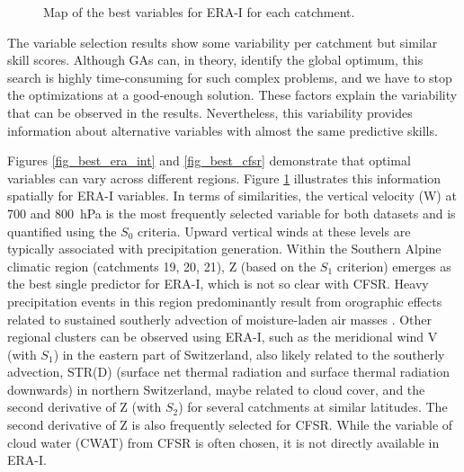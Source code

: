 \documentclass[draft]{agujournal2019}
\begin{document}
\begin{figure}[hbt]
	\noindent{}
	\caption{Map of the best variables for ERA-I for each catchment.}
	\label{fig_map_variables}
\end{figure}

The variable selection results show some variability per catchment but similar skill scores. Although GAs can, in theory, identify the global optimum, this search is highly time-consuming for such complex problems, and we have to stop the optimizations at a good-enough solution. These factors explain the variability that can be observed in the results. Nevertheless, this variability provides information about alternative variables with almost the same predictive skills.

Figures \ref{fig_best_era_int} and \ref{fig_best_cfsr} demonstrate that optimal variables can vary across different regions. Figure \ref{fig_map_variables} illustrates this information spatially for ERA-I variables. In terms of similarities, the vertical velocity (W) at 700 and 800~hPa is the most frequently selected variable for both datasets and is quantified using the $S_{0}$ criteria. Upward vertical winds at these levels are typically associated with precipitation generation. Within the Southern Alpine climatic region (catchments 19, 20, 21), Z (based on the $S_{1}$ criterion) emerges as the best single predictor for ERA-I, which is not so clear with CFSR. Heavy precipitation events in this region predominantly result from orographic effects related to sustained southerly advection of moisture-laden air masses \cite{Massacand1998}. Other regional clusters can be observed using ERA-I, such as the meridional wind V (with $S_{1}$) in the eastern part of Switzerland, also likely related to the southerly advection, STR(D) (surface net thermal radiation and surface thermal radiation downwards) in northern Switzerland, maybe related to cloud cover, and the second derivative of Z (with $S_{2}$) for several catchments at similar latitudes. The second derivative of Z is also frequently selected for CFSR. While the variable of cloud water (CWAT) from CFSR is often chosen, it is not directly available in ERA-I.
\end{document}
